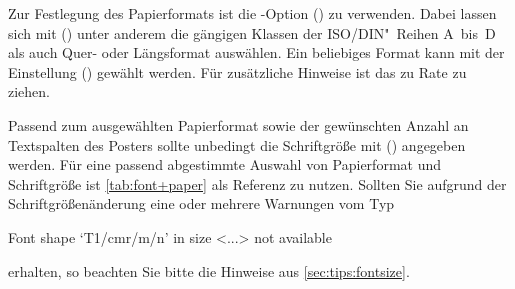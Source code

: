 \begin{DeclareEntity}{}
Zur Festlegung des Papierformats ist die \KOMAScript-Option 
() zu verwenden. Dabei lassen 
sich mit () unter anderem 
die gängigen Klassen der ISO/DIN"~Reihen A~bis~D als auch Quer- oder 
Längsformat auswählen. Ein beliebiges Format kann mit der Einstellung
() gewählt werden. Für 
zusätzliche Hinweise ist das \scrguide zu Rate zu ziehen.

Passend zum ausgewählten Papierformat sowie der gewünschten Anzahl an 
Textspalten des Posters sollte unbedingt die Schriftgröße mit 
() angegeben werden. Für eine 
passend abgestimmte Auswahl von Papierformat und Schriftgröße ist 
\autoref{tab:font+paper} als Referenz zu nutzen. Sollten Sie aufgrund der 
Schriftgrößenänderung eine oder mehrere Warnungen vom Typ
%
\begin{quoting}
\begin{Code}
Font shape `T1/cmr/m/n' in size <...> not available
\end{Code}
\end{quoting}
%
erhalten, so beachten Sie bitte die Hinweise aus \autoref{sec:tips:fontsize}.



\end{DeclareEntity}
